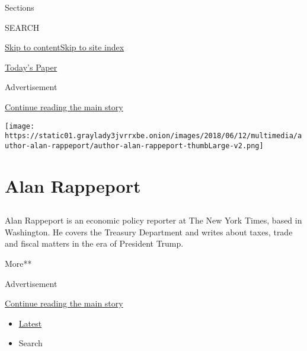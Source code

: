 Sections

SEARCH

\protect\hyperlink{site-content}{Skip to
content}\protect\hyperlink{site-index}{Skip to site index}

\href{https://myaccount.nytimes3xbfgragh.onion/auth/login?response_type=cookie\&client_id=vi}{}

\href{https://www.nytimes3xbfgragh.onion/section/todayspaper}{Today's
Paper}

Advertisement

\protect\hyperlink{after-top}{Continue reading the main story}

\texttt{[image: https://static01.graylady3jvrrxbe.onion/images/2018/06/12/multimedia/author-alan-rappeport/author-alan-rappeport-thumbLarge-v2.png]}

\hypertarget{alan-rappeport}{%
\section{Alan Rappeport}\label{alan-rappeport}}

\hypertarget{section}{%
\subsection{}\label{section}}

Alan Rappeport is an economic policy reporter at The New York Times,
based in Washington. He covers the Treasury Department and writes about
taxes, trade and fiscal matters in the era of President Trump.

More**

Advertisement

\protect\hyperlink{after-mid1}{Continue reading the main story}

\begin{itemize}
\tightlist
\item
  \protect\hyperlink{stream-panel}{Latest}
\item
  Search
\end{itemize}

